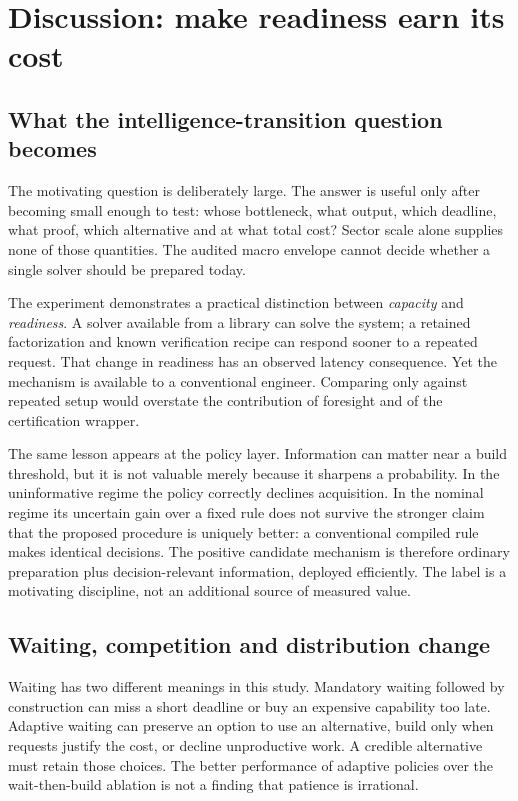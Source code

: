 \section{Discussion: make readiness earn its cost}
\subsection{What the intelligence-transition question becomes}
The motivating question is deliberately large. The answer is useful only after becoming small enough to test: whose bottleneck, what output, which deadline, what proof, which alternative and at what total cost? Sector scale alone supplies none of those quantities. The audited macro envelope cannot decide whether a single solver should be prepared today.

The experiment demonstrates a practical distinction between \emph{capacity} and \emph{readiness}. A solver available from a library can solve the system; a retained factorization and known verification recipe can respond sooner to a repeated request. That change in readiness has an observed latency consequence. Yet the mechanism is available to a conventional engineer. Comparing only against repeated setup would overstate the contribution of foresight and of the certification wrapper.

The same lesson appears at the policy layer. Information can matter near a build threshold, but it is not valuable merely because it sharpens a probability. In the uninformative regime the policy correctly declines acquisition. In the nominal regime its uncertain gain over a fixed rule does not survive the stronger claim that the proposed procedure is uniquely better: a conventional compiled rule makes identical decisions. The positive candidate mechanism is therefore ordinary preparation plus decision-relevant information, deployed efficiently. The label \TI{} is a motivating discipline, not an additional source of measured value.

\subsection{Waiting, competition and distribution change}
Waiting has two different meanings in this study. Mandatory waiting followed by construction can miss a short deadline or buy an expensive capability too late. Adaptive waiting can preserve an option to use an alternative, build only when requests justify the cost, or decline unproductive work. A credible alternative must retain those choices. The better performance of adaptive policies over the wait-then-build ablation is not a finding that patience is irrational.


